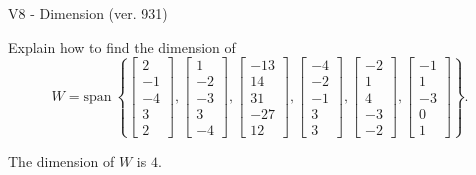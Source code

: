 \begin{exercise}
  \begin{exerciseTitle}V8 - Dimension (ver. 931)\end{exerciseTitle}
  \begin{exerciseStatement}
    Explain how to find the dimension of 
\[W=\mathrm{span}\ \left\{\left[\begin{array}{r}
2 \\
-1 \\
-4 \\
3 \\
2
\end{array}\right] , \left[\begin{array}{r}
1 \\
-2 \\
-3 \\
3 \\
-4
\end{array}\right] , \left[\begin{array}{r}
-13 \\
14 \\
31 \\
-27 \\
12
\end{array}\right] , \left[\begin{array}{r}
-4 \\
-2 \\
-1 \\
3 \\
3
\end{array}\right] , \left[\begin{array}{r}
-2 \\
1 \\
4 \\
-3 \\
-2
\end{array}\right] , \left[\begin{array}{r}
-1 \\
1 \\
-3 \\
0 \\
1
\end{array}\right]\right\}.\]



  \end{exerciseStatement}
  \begin{exerciseAnswer}
   The dimension of \(W\) is  \(4\).
  


  \end{exerciseAnswer}
\end{exercise}
